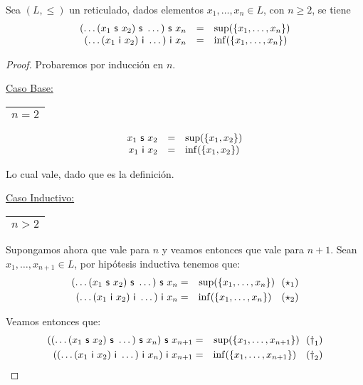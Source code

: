   \begin{lemma}
    \PN Sea $(L, \leq)$ un reticulado, dados elementos $x_{1}, \dotsc, x_{n} \in L$, con $n \geq 2$, se tiene
    \[
      \begin{array}{rcl}
        (\dotsc (x_{1} \ \mathsf{s} \ x_{2}) \ \mathsf{s} \ \dotsc) \ \mathsf{s} \ x_{n} &=& \sup (\{x_{1}, \dotsc, x_{n}\}) \\
        (\dotsc (x_{1} \ \mathsf{i} \ x_{2}) \ \mathsf{i} \ \dotsc) \ \mathsf{i} \ x_{n} &=& \inf (\{x_{1}, \dotsc, x_{n}\})
      \end{array}
    \]
  \end{lemma}
  \begin{proof}
    \PN Probaremos por inducción en $n$.

    \vspace{3mm}
    \PN \underline{Caso Base:} \begin{tabular}{|c|} \hline $n = 2$ \\\hline \end{tabular}
    \[
      \begin{array}{rcl}
        x_{1} \ \mathsf{s} \ x_{2} &=& \sup(\{x_{1}, x_{2}\}) \\
        x_{1} \ \mathsf{i} \ x_{2} &=& \inf(\{x_{1}, x_{2}\})
      \end{array}
    \]

    \PN Lo cual vale, dado que es la definición.

    \vspace{3mm}
		\PN \underline{Caso Inductivo:} \begin{tabular}{|c|} \hline $n > 2$ \\\hline \end{tabular}

    \PN Supongamos ahora que vale para $n$ y veamos entonces que vale para $n+1$. Sean $x_{1}, \dotsc, x_{n+1} \in L$,
    por hipótesis inductiva tenemos que:
    \begin{eqnarray*}
      (\dotsc (x_{1} \ \mathsf{s} \ x_{2}) \ \mathsf{s} \ \dotsc) \ \mathsf{s} \ x_{n} &=& \sup(\{x_{1}, \dotsc, x_{n}\}) \ \ (\star_{1}) \\
      (\dotsc (x_{1} \ \mathsf{i} \ x_{2}) \ \mathsf{i} \ \dotsc) \ \mathsf{i} \ x_{n} &=& \inf(\{x_{1}, \dotsc, x_{n}\}) \ \ \ (\star_{2})
    \end{eqnarray*}


    \PN Veamos entonces que:
    \begin{eqnarray*}
      ((\dotsc(x_{1} \ \mathsf{s} \ x_{2}) \ \mathsf{s} \ \dotsc) \ \mathsf{s} \ x_{n}) \ \mathsf{s} \ x_{n+1} &=& \sup(\{x_{1}, \dotsc, x_{n+1}\})
        \ \ (\dag_{1}) \\
      ((\dotsc(x_{1} \ \mathsf{i} \ x_{2}) \ \mathsf{i} \ \dotsc) \ \mathsf{i} \ x_{n}) \ \mathsf{i} \ x_{n+1} &=& \inf(\{x_{1}, \dotsc, x_{n+1}\})
        \ \ \ (\dag_{2})
    \end{eqnarray*}


\end{proof}
